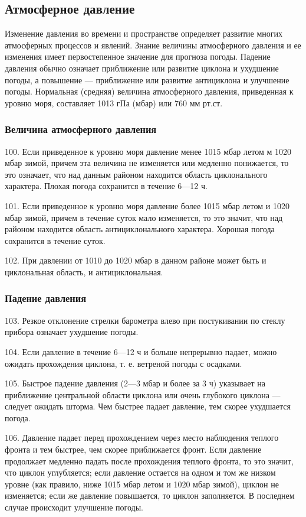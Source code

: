 \subsection{Атмосферное давление}

Изменение давления во времени и пространстве определяет развитие многих атмосферных процессов и явлений. Знание величины атмосферного давления и ее изменения имеет первостепенное значение для прогноза погоды. Падение давления обычно означает приближение или развитие циклона и ухудшение погоды, а повышение — приближение или развитие антициклона и улучшение погоды. Нормальная (средняя) величина атмосферного давления, приведенная к уровню моря, составляет 1013 гПа (мбар) или 760 мм рт.ст.

\subsubsection{Величина атмосферного давления}

100. Если приведенное к уровню моря давление менее 1015 мбар летом м 1020 мбар зимой, причем эта величина не изменяется или медленно понижается, то это означает, что над данным районом находится область циклонального характера. Плохая погода сохранится в течение 6—12 ч.

101. Если приведенное к уровню моря давление более 1015 мбар летом и 1020 мбар зимой, причем в течение суток мало изменяется, то это значит, что над районом находится область антициклонального характера. Хорошая погода сохранится в течение суток.

102. При давлении от 1010 до 1020 мбар в данном районе может быть и циклональная область, и антициклональная.

\subsubsection{Падение давления}

103. Резкое отклонение стрелки барометра влево при постукивании по стеклу прибора означает ухудшение погоды.

104. Если давление в течение 6—12 ч и больше непрерывно падает, можно ожидать прохождения циклона, т. е. ветреной погоды с осадками.

105. Быстрое падение давления (2—3 мбар и более за 3 ч) указывает на приближение центральной области циклона или очень глубокого циклона — следует ожидать шторма. Чем быстрее падает давление, тем скорее ухудшается погода.

106. Давление падает перед прохождением через место наблюдения теплого фронта и тем быстрее, чем скорее приближается фронт. Если давление продолжает медленно падать после прохождения теплого фронта, то это значит, что циклон углубляется; если давление остается на одном и том же низком уровне (как правило, ниже 1015 мбар летом и 1020 мбар зимой), циклон не изменяется; если же давление повышается, то циклон заполняется. В последнем случае происходит улучшение погоды.

